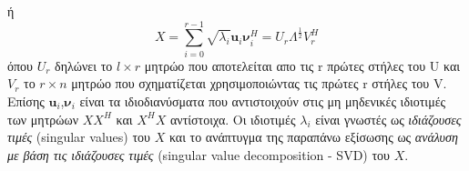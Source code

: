 \hspace*{\fill}\newline
ή
\newline\hspace*{\fill}
\begin{equation}
	X = \sum_{i=0}^{r-1} \sqrt{\lambda_{i}} \mathbf{u}_{i}\mathbf{\nu}_{i}^{H} = U_{r}\Lambda^{\frac{1}{2}}V_{r}^{H}
\end{equation}
\hspace*{\fill}\newline
όπου $U_{r}$ δηλώνει το $l \times r$ μητρώο που αποτελείται απο τις \textlatin{r} πρώτες στήλες του \textlatin{U} και $V_{r}$ το $r \times n$ μητρώο που σχηματίζεται χρησιμοποιώντας τις πρώτες \textlatin{r} στήλες του \textlatin{V}. Επίσης $ \mathbf{u}_{i} $,$ \mathbf{\nu}_{i} $ είναι τα ιδιοδιανύσματα που αντιστοιχούν στις μη μηδενικές ιδιοτιμές των μητρώων $XX^{H}$ και $X^{H}X$ αντίστοιχα. Οι ιδιοτιμές $ \lambda_{i} $ είναι γνωστές ως \textit{ιδιάζουσες τιμές} \textlatin(singular values) του $X$ και το ανάπτυγμα της παραπάνω εξίσωσης ως \textit{ανάλυση με βάση τις ιδιάζουσες τιμές} \textlatin{(singular value decomposition - SVD)} του $X$.
